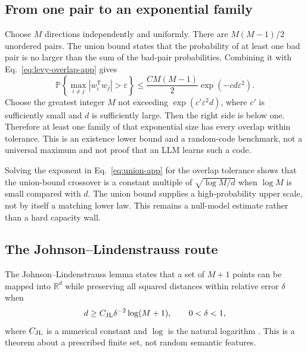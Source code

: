\documentclass[
  aps,
  reprint,
  superscriptaddress,
  floatfix,
  nofootinbib,
  longbibliography
]{revtex4-2}
\newcommand{\R}{\mathbb{R}}
\newcommand{\Prob}{\mathbb{P}}
\newcommand{\T}{^{\mathsf T}}
\begin{document}
\subsection{From one pair to an exponential family}

Choose $M$ directions independently and uniformly.  There are
$M(M-1)/2$ unordered pairs.  The union bound states that the probability of at
least one bad pair is no larger than the sum of the bad-pair probabilities.
Combining it with Eq.~\eqref{eq:levy-overlap-app} gives
\begin{equation}
 \Prob\!\left\{
 \max_{i\ne j}|w_i\T w_j|>\varepsilon
 \right\}
 \leq \frac{C M(M-1)}{2}
 \exp(-c d\varepsilon^2).
 \label{eq:union-app}
\end{equation}
Choose the greatest integer $M$ not exceeding
$\exp(c'\varepsilon^2d)$, where $c'$ is sufficiently small and $d$ is
sufficiently large.  Then the right side is below one.  Therefore at least one
family of that exponential size has every overlap within tolerance.  This is
an existence lower bound and a random-code benchmark, not a universal maximum
and not proof that an LLM learns such a code.

Solving the exponent in Eq.~\eqref{eq:union-app} for the overlap tolerance
shows that the union-bound crossover is a constant multiple of
$\sqrt{\log M/d}$ when $\log M$ is small compared with $d$.  The union bound
supplies a high-probability upper scale, not by itself a matching lower law.
This remains a null-model estimate rather than a hard capacity wall.

\subsection{The Johnson--Lindenstrauss route}

The Johnson--Lindenstrauss lemma states that a set of $M+1$ points can be mapped
into $\R^d$ while preserving all squared distances within relative error
$\delta$ when
\begin{equation}
 d\geq C_{\rm JL}\delta^{-2}\log(M+1),
 \qquad 0<\delta<1,
 \label{eq:jl-app}
\end{equation}
where $C_{\rm JL}$ is a numerical constant and $\log$ is the natural logarithm
\cite{johnson-1984,Dasgupta-2003}.  This is a theorem about a prescribed finite
set, not random semantic features.
\end{document}
